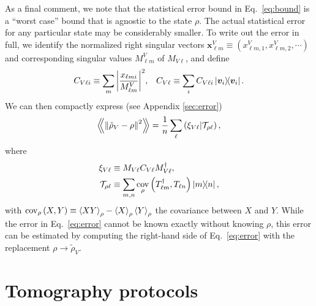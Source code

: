 \documentclass[notitlepage,twocolumn]{revtex4-2}
\newcommand{\f}[2]{\dfrac{#1}{#2}} %
\newcommand{\p}[1]{\left(#1\right)} %
\newcommand{\bk}{\Braket} %
\renewcommand{\v}{\bm} %
\newcommand{\Bbk}[1]
{\left\langle\!\!\left\langle #1 \right\rangle\!\!\right\rangle}
\newcommand{\T}{\mathcal{T}}
\def\obk#1{\mathinner{({#1})}}
\DeclareMathOperator{\cov}{cov}
\begin{document}
As a final comment, we note that the statistical error bound in Eq.~\eqref{eq:bound} is a ``worst case'' bound that is agnostic to the state $\rho$.
The actual statistical error for any particular state may be considerably smaller.
To write out the error in full, we identify the normalized right singular vectors $\v x^V_{\ell m}\equiv (x^V_{\ell m,1}, x^V_{\ell m,2}, \cdots)$ and corresponding singular values $M^V_{\ell m}$ of $M_{V\ell}$, and define
\begin{align}
  C_{V\ell i} \equiv \sum_m \abs{\f{x_{\ell m i}}{M^V_{\ell m}}}^2,
  &&
  C_{V\ell} \equiv \sum_i C_{V\ell i} \op{\v v_i}.
\end{align}
We can then compactly express (see Appendix \ref{sec:error})
\begin{align}
  \Bbk{\norm{\tilde\rho_V-\rho}^2}
  = \f1n \sum_\ell \obk{\xi_{V\ell}|\T_{\rho\ell}},
  \label{eq:error}
\end{align}
where
\begin{align}
  \xi_{V\ell} &\equiv M_{V\ell} C_{V\ell} M_{V\ell}^\dag, \\
  \T_{\rho\ell} &\equiv \sum_{m,n}
  \cov_\rho\p{T_{\ell m}^\dag, T_{\ell n}} \op{m}{n},
\end{align}
with $\cov_\rho\p{X,Y} \equiv \bk{XY}_\rho - \bk{X}_\rho \bk{Y}_\rho$ the covariance between $X$ and $Y$.
While the error in Eq.~\eqref{eq:error} cannot be known exactly without knowing $\rho$, this error can be estimated by computing the right-hand side of Eq.~\eqref{eq:error} with the replacement $\rho\to\tilde\rho_V$.

\section{Tomography protocols}
\label{sec:protocol}
\end{document}
